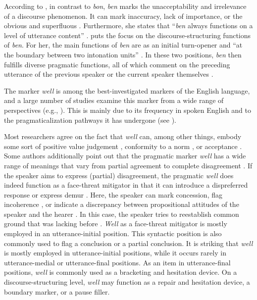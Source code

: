 \documentclass[output=paper]{langscibook}
\begin{document}
According to \citet[247]{MosegaardHansen.1998}, in contrast to \textit{bon}, \textit{ben} marks the unacceptability and irrelevance of a discourse phenomenon. It can mark inaccuracy, lack of importance, or the obvious and superfluous \citep[247]{MosegaardHansen.1998}. Furthermore, she states that “\textit{ben} always functions on a level of utterance content” \citep[234]{MosegaardHansen.1998}. \citet{Waters.2009} puts the focus on the discourse-structuring functions of \textit{ben}. For her, the main functions of \textit{ben} are as an initial turn-opener and “at the boundary between two intonation units” \citep[15]{Waters.2009}. In these two positions, \textit{ben} then fulfills diverse pragmatic functions, all of which comment on the preceding utterance of the previous speaker or the current speaker themselves \citep[15]{Waters.2009}. 


The marker \textit{well} is among the best-investigated markers of the English language, and a large number of studies examine this marker from a wide range of perspectives (e.g., \citealt{Lakoff.1973,Schiffrin.1987,Jucker.1997,Aijmer.2003,Beeching.2011}). This is mainly due to its frequency in spoken English and to the pragmaticalization pathways it has undergone (see \citealt{Beeching.2011}). 

Most researchers agree on the fact that \textit{well} can, among other things, embody some sort of positive value judgement \citep{Aijmer.2003}, conformity to a norm \citep{Bolinger.1989}, or acceptance \citep{Carlson.1984}. Some authors additionally point out that the pragmatic marker \textit{well} has a wide range of meanings that vary from partial agreement to complete disagreement \citep{Cuenca.2008}. If the speaker aims to express (partial) disagreement, the pragmatic \textit{well} does indeed function as a face-threat mitigator in that it can introduce a dispreferred response or express demur \citep{Beeching.2011}. Here, the speaker can mark concession, flag incoherence \citep{Beeching.2011}, or indicate a discrepancy between propositional attitudes of the speaker and the hearer \citep{Smith.2000}. In this case, the speaker tries to reestablish common ground that was lacking before \citep{Smith.2000}. \textit{Well} as a face-threat mitigator is mostly employed in an utterance-initial position. This syntactic position is also commonly used to flag a conclusion or a partial conclusion. It is striking that \textit{well} is mostly employed in utterance-initial positions, while it occurs rarely in utterance-medial or utterance-final positions. As an item in utterance-final positions, \textit{well} is commonly used as a bracketing and hesitation device. On a discourse-structuring level, \textit{well} may function as a repair and hesitation device, a boundary marker, or a pause filler. 
\end{document}
